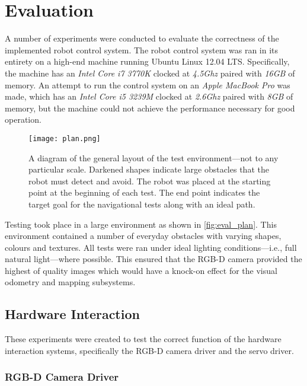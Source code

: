 \chapter{Evaluation}
\label{chap:evaluation}


A number of experiments were conducted to evaluate the correctness of the implemented robot control system. The robot control system was ran in its entirety on a high-end machine running Ubuntu Linux 12.04 LTS. Specifically, the machine has an \emph{Intel Core i7 3770K} clocked at \emph{4.5Ghz} paired with \emph{16GB} of memory. An attempt to run the control system on an \emph{Apple MacBook Pro} was made, which has an \emph{Intel Core i5 3239M} clocked at \emph{2.6Ghz} paired with \emph{8GB} of memory, but the machine could not achieve the performance necessary for good operation.

\begin{figure}[!h]
	\centering
	\texttt{[image: plan.png]}
	\caption{A diagram of the general layout of the test environment---not to any particular scale. Darkened shapes indicate large obstacles that the robot must detect and avoid. The robot was placed at the starting point at the beginning of each test. The end point indicates the target goal for the navigational tests along with an ideal path.}
	\label{fig:eval_plan}
\end{figure}

Testing took place in a large environment as shown in \autoref{fig:eval_plan}. This environment contained a number of everyday obstacles with varying shapes, colours and textures. All tests were ran under ideal lighting conditions---i.e., full natural light---where possible. This ensured that the RGB-D camera provided the highest of quality images which would have a knock-on effect for the visual odometry and mapping subsystems.

\section{Hardware Interaction}

These experiments were created to test the correct function of the hardware interaction systems, specifically the RGB-D camera driver and the servo driver.

\subsection{RGB-D Camera Driver}

